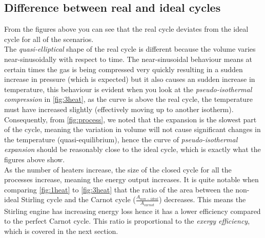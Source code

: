 \documentclass[10pt]{article}
\begin{document}
\subsection{Difference between real and ideal cycles}
\FloatBarrier
{}
\FloatBarrier
\noindent
From the figures above you can see that the real cycle deviates from the ideal cycle for all of the scenarios. \\The \emph{quasi-elliptical} shape of the real cycle is different because the volume varies near-sinusoidally with respect to time. The near-sinusoidal behaviour means at certain times the gas is being compressed very quickly resulting in a sudden increase in pressure (which is expected) but it also causes an sudden increase in temperature, this behaviour is evident when you look at the \emph{pseudo-isothermal compression} in \autoref{fig:3heat}, as the curve is above the real cycle, the temperature must have increased slightly (effectively moving up to another isotherm).\\ Consequently, from \autoref{fig:process}, we noted that the expansion is the slowest part of the cycle, meaning the variation in volume will not cause significant changes in the temperature (quasi-equilibrium), hence the curve of \emph{pseudo-isothermal expansion} should be reasonably close to the ideal cycle, which is exactly what the figures above show.
\\[1em] 
As the number of heaters increase, the size of the closed cycle for all the processes increase, meaning the energy output increases. It is quite notable
when comparing \autoref{fig:1heat} to \autoref{fig:3heat} that the ratio of the area between the non-ideal Stirling cycle and the Carnot cycle ($\frac{A_{non-ideal}}{A_{carnot}}$) decreases. This means the Stirling engine has increasing energy loss hence it has a lower efficiency compared to the perfect Carnot cycle. This ratio is proportional to the \emph{exergy efficiency}, which is covered in the next section.
\pagebreak
\end{document}
